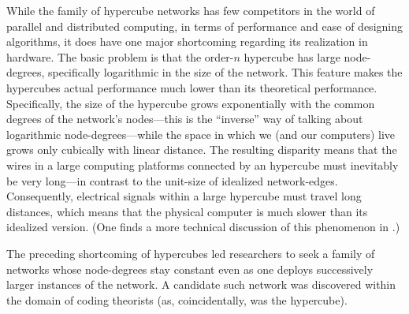 While the family of hypercube networks has few competitors in the
world of parallel and distributed computing, in terms of performance
and ease of designing algorithms, it does have one major shortcoming
regarding its realization in hardware.  The basic problem is that the
order-$n$ hypercube has large node-degrees, specifically logarithmic
in the size of the network.  This feature makes the hypercubes actual
performance much lower than its theoretical performance.
Specifically, the size of the hypercube grows exponentially with the
common degrees of the network's nodes---this is the ``inverse'' way
of talking about logarithmic node-degrees---while the space in which
we (and our computers) live grows only cubically with linear
distance.  The resulting disparity means that the wires in a large
computing platforms connected by an hypercube must inevitably be very long---in contrast to the unit-size
of idealized network-edges.  Consequently, electrical signals within a
large hypercube must travel long distances, which means that the
physical computer is much slower than its idealized version.  (One
finds a more technical discussion of this phenomenon in
\cite{Ullman84}.)

The preceding shortcoming of hypercubes led researchers to seek a
family of networks whose node-degrees stay constant even as one
deploys successively larger instances of the network.  A candidate
such network was discovered within the domain of coding theorists (as,
coincidentally, was the hypercube).  


